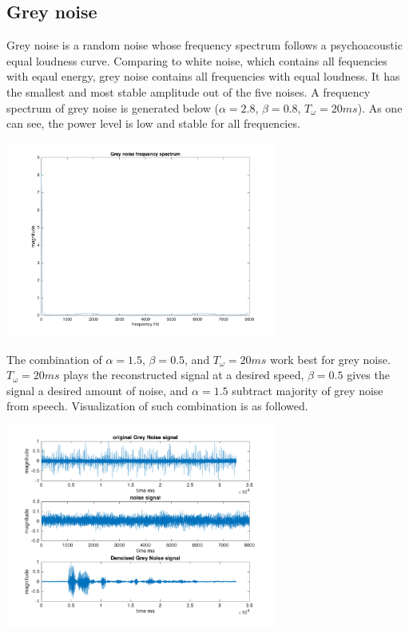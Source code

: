 \documentclass[journal]{IEEEtran}
\begin{document}
\subsection{Grey noise}
\begin{flushleft}
Grey noise is a random noise whose frequency spectrum follows a psychoacoustic equal loudness curve. Comparing to white noise, which contains all fequencies with eqaul energy, grey noise contains all frequencies with equal loudness. It has the smallest and most stable amplitude out of the five noises. A frequency spectrum of grey noise is generated below ($\alpha = 2.8$, $\beta = 0.8$, $T_\omega = 20ms$). As one can see, the power level is low and stable for all frequencies.
\end{flushleft}
\centering 
\includegraphics[width=3.5in]{greynoise_log}
\begin{flushleft}
The combination of $\alpha = 1.5$, $\beta = 0.5$, and $T_\omega = 20ms$ work best for grey noise. $T_\omega = 20ms$ plays the reconstructed signal at a desired speed, $\beta = 0.5$ gives the signal a desired amount of noise, and $\alpha = 1.5$ subtract majority of grey noise from speech. Visualization of such combination is as followed. 
\end{flushleft}
\centering 
\includegraphics[width=3.5in]{greyNoise}
\end{document}
